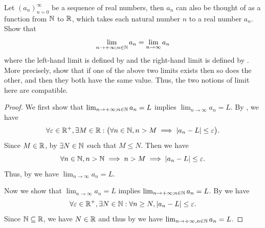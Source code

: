\exercisesection

\begin{ex}\label{i:ex:9.10.1}
  Let \((a_n)_{n = 0}^\infty\) be a sequence of real numbers, then \(a_n\) can also be thought of as a function from \(\mathbb{N}\) to \(\mathbb{R}\), which takes each natural number \(n\) to a real number \(a_n\).
  Show that
  \[
    \lim_{n \to +\infty ; n \in \mathbb{N}} a_n = \lim_{n \to \infty} a_n
  \]
  where the left-hand limit is defined by  and the right-hand limit is defined by .
  More precisely, show that if one of the above two limits exists then so does the other, and then they both have the same value.
  Thus, the two notions of limit here are compatible.
\end{ex}

\begin{proof}
  We first show that \(\lim_{n \to +\infty ; n \in \mathbb{N}} a_n = L\) implies \(\lim_{n \to \infty} a_n = L\).
  By , we have
  \[
    \forall \varepsilon \in \mathbb{R}^+, \exists M \in \mathbb{R} : \big(\forall n \in \mathbb{N}, n > M \implies \left\lvert a_n - L\right\rvert \leq \varepsilon\big).
  \]
  Since \(M \in \mathbb{R}\), by  \(\exists N \in \mathbb{N}\) such that \(M \leq N\).
  Then we have
  \[
    \forall n \in \mathbb{N}, n > \mathbb{N} \implies n > M \implies \left\lvert a_n - L\right\rvert \leq \varepsilon.
  \]
  Thus, by  we have \(\lim_{n \to \infty} a_n = L\).

  Now we show that \(\lim_{n \to \infty} a_n = L\) implies \(\lim_{n \to +\infty ; n \in \mathbb{N}} a_n = L\).
  By  we have
  \[
    \forall \varepsilon \in \mathbb{R}^+, \exists N \in \mathbb{N} : \forall n \geq N, \left\lvert a_n - L\right\rvert \leq \varepsilon.
  \]
  Since \(\mathbb{N} \subseteq \mathbb{R}\), we have \(N \in \mathbb{R}\) and thus by  we have \(\lim_{n \to +\infty, n \in \mathbb{N}} a_n = L\).
\end{proof}
